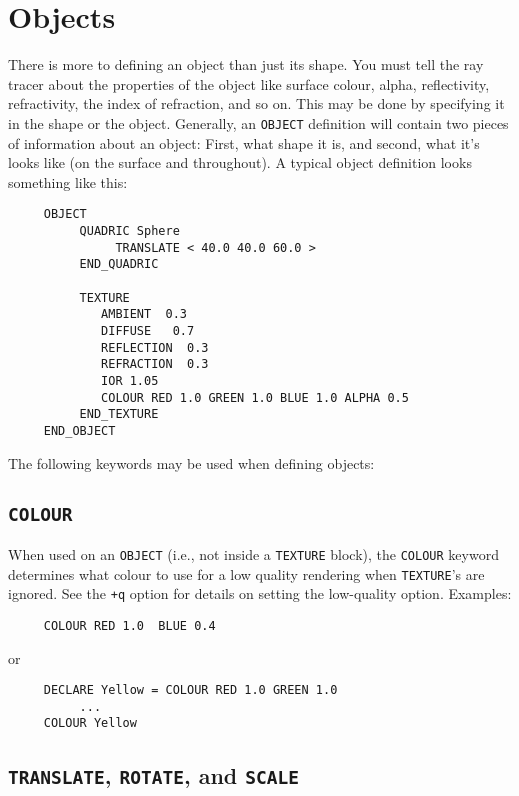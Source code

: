 \section{Objects}

There is more to defining an object than just its shape.  You must tell the
ray tracer about the properties of the object like surface colour, alpha,
reflectivity, refractivity, the index of refraction, and so on.  This may be
done by specifying it in the shape or the object.  Generally, an
{\tt OBJECT}
definition will contain two pieces of information about an object: First, what
shape it is, and second, what it's looks like (on the surface and throughout).
A typical object definition looks something like this:
\begin{verbatim}
     OBJECT
          QUADRIC Sphere
               TRANSLATE < 40.0 40.0 60.0 >
          END_QUADRIC

          TEXTURE
             AMBIENT  0.3
             DIFFUSE   0.7
             REFLECTION  0.3
             REFRACTION  0.3
             IOR 1.05
             COLOUR RED 1.0 GREEN 1.0 BLUE 1.0 ALPHA 0.5
          END_TEXTURE
     END_OBJECT
\end{verbatim}

\noindent
The following keywords may be used when defining objects:

\subsection{{\tt COLOUR}}

When used on an {\tt OBJECT} (i.e., not inside a {\tt TEXTURE} block),
the {\tt COLOUR} keyword determines what colour to use for a low
quality rendering when {\tt TEXTURE}'s are ignored.  See the
{\tt +q}
option for details on setting the low-quality option. Examples:
\begin{verbatim}
     COLOUR RED 1.0  BLUE 0.4
\end{verbatim}
or
\begin{verbatim}
     DECLARE Yellow = COLOUR RED 1.0 GREEN 1.0
          ...
     COLOUR Yellow
\end{verbatim}

\subsection{{\tt TRANSLATE}, {\tt ROTATE}, and {\tt SCALE}}

